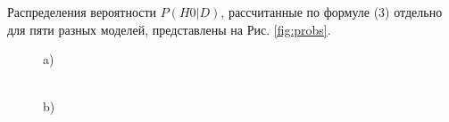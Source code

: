 


Распределения вероятности $P( H0 |D)$, рассчитанные по формуле (3) отдельно для пяти разных моделей, представлены на Рис. \ref{fig:probs}. 

\begin{figure}[H]
\begin{minipage}[h]{0.47\linewidth}
 a) \\
\end{minipage}
\hfill
\begin{minipage}[h]{0.47\linewidth}
 \\b)

\end{minipage}
\end{figure}
